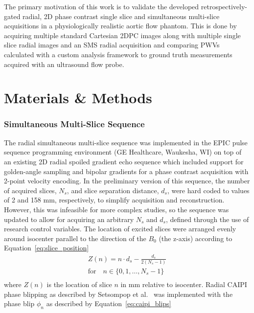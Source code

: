 The primary motivation of this work is to validate the developed retrospectively-gated radial, 2D phase contrast single slice and simultaneous multi-slice acquisitions in a physiologically realistic aortic flow phantom. This is done by acquiring multiple standard Cartesian 2DPC images along with multiple single slice radial images and an SMS radial acquisition and comparing PWVs calculated with a custom analysis framework to ground truth measurements acquired with an ultrasound flow probe.

\section{Materials \& Methods}\label{sec:phantom_methods}
\subsubsection{Simultaneous Multi-Slice Sequence}
The radial simultaneous multi-slice sequence was implemented in the EPIC pulse sequence programming environment (GE Healthcare, Waukesha, WI) on top of an existing 2D radial spoiled gradient echo sequence which included support for golden-angle sampling and bipolar gradients for a phase contrast acquisition with 2-point velocity encoding. In the preliminary version of this sequence, the number of acquired slices, $N_s$, and slice separation distance, $d_s$, were hard coded to values of 2 and 158 mm, respectively, to simplify acquisition and reconstruction. However, this was infeasible for more complex studies, so the sequence was updated to allow for acquiring an arbitrary $N_s$ and $d_s$, defined through the use of research control variables. The location of excited slices were arranged evenly around isocenter parallel to the direction of the $B_0$ (the z-axis) according to Equation~\ref{eq:slice_position} 
\begin{equation}
    \begin{split}
        Z(n) = n\cdot d_s - \frac{d_s}{2(N_s - 1)} \\
        \text{for} \quad  n \in \{0,1, \dots, N_s - 1\} \\
    \end{split}
    \label{eq:slice_position}
\end{equation}
where $Z(n)$ is the location of slice $n$ in mm relative to isocenter. Radial CAIPI phase blipping as described by Setsompop et al.~\cite{setsompopBlippedControlledAliasingParallel2012a} was implemented with the phase blip $\phi_n$ as described by Equation~\ref{eq:caipi_blips} 
